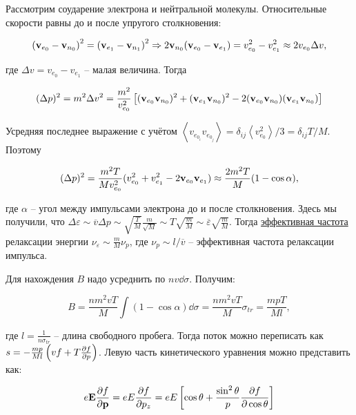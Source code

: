 \documentclass[10pt, a4paper]{article}
\begin{document}
Рассмотрим соударение электрона и нейтральной молекулы. Относительные скорости равны до и после упругого столкновения:

\begin{equation*}
	\left(\vb{v}_{e_0}-\vb{v}_{n_0}\right)^2 = \left(\vb{v}_{e_1}-\vb{v}_{n_1}\right)^2 \Rightarrow 2\vb{v}_{n_0}(\vb{v}_{e_0}-\vb{v}_{e_1})=v_{e_0}^2-v_{e_1}^2\approx2v_{e_0}\Delta v,
\end{equation*}

где $\Delta v = v_{e_0}-v_{e_1}$ -- малая величина. Тогда

\begin{equation*}
	(\Delta p)^2 = m^2\Delta v^2 = \frac{m^2}{v_{e_0}^2}\left[ (\vb{v}_{e_0}\vb{v}_{n_0})^2+(\vb{v}_{e_1}\vb{v}_{n_0})^2-2(\vb{v}_{e_0}\vb{v}_{n_0})(\vb{v}_{e_1}\vb{v}_{n_0})\right] 
\end{equation*}

Усредняя последнее выражение с учётом $\left\langle v_{e_{0_i}}v_{e_{0_j}}\right\rangle = \delta_{ij}\left\langle v_{e_0}^2\right\rangle/3 = \delta_{ij}T/M$. Поэтому

\begin{equation*}
	(\Delta p)^2 = \frac{m^2T}{Mv_{e_0}^2}(v_{e_0}^2+v_{e_1}^2- 2\vb{v}_{e_0}\vb{v}_{e_1})\approx\frac{2m^2T}{M}(1-\cos\alpha),
\end{equation*} 

где $\alpha$ -- угол между импульсами электрона до и после столкновения. Здесь мы получили, что $\Delta\varepsilon\sim\overline{v}\Delta p\sim \sqrt{\frac{T}{M}}\frac{m}{\sqrt{M}}\sim T\sqrt{\frac{m}{M}} \sim\overline{\varepsilon}\sqrt{\frac{m}{M}}$. Тогда \uline{эффективная частота} релаксации энергии $\nu_\varepsilon\sim\frac{m}{M}\nu_p$, где $\nu_p\sim l/\overline{v}$ -- эффективная частота релаксации импульса.

Для нахождения $B$ надо усреднить по $nv\dd{\sigma}$. Получим:

\begin{equation*}
	B = \frac{nm^2vT}{M}\int(1-\cos\alpha)\dd{\sigma} = \frac{nm^2vT}{M}\sigma_{tr} = \frac{mpT}{Ml},
\end{equation*}

где $l = \frac{1}{n\sigma_{tr}}$ -- длина свободного пробега. Тогда поток можно переписать как $s = -\frac{mp}{Ml} \left(vf+T\pdv{f}{p}\right)$. Левую часть кинетического уравнения можно представить как:

\begin{equation*}
	e\vb{E}\pdv{f}{\vb{p}} = eE\pdv{f}{p_z}=eE\left[\cos\theta + \frac{\sin^2\theta}{p}\pdv{f}{\cos\theta}\right] 
\end{equation*}
\end{document}
